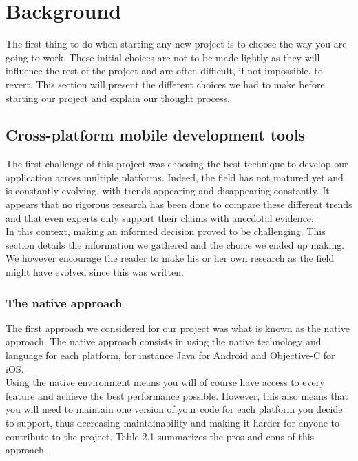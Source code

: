 \documentclass{eplmastersthesis}
\begin{document}
\chapter{Background}

The first thing to do when starting any new project is to choose the way you are going to work. These initial choices are not to be made lightly as they will influence the rest of the project and are often difficult, if not impossible, to revert. This section will present the different choices we had to make before starting our project and explain our thought process. 

\section{Cross-platform mobile development tools}

The first challenge of this project was choosing the best technique to develop our application across multiple platforms. Indeed, the field has not matured yet and is constantly evolving, with trends appearing and disappearing constantly. It appears that no rigorous research has been done to compare these different trends and that even experts only support their claims with anecdotal evidence.\\

 In this context, making an informed decision proved to be challenging. This section details the information we gathered and the choice we ended up making. We however encourage the reader to make his or her own research as the field might have evolved since this was written.

\subsection{The native approach}

The first approach we considered for our project was what is known as the native approach. The native approach consists in using the native technology and language for each platform, for instance Java for Android and Objective-C for iOS. \\

Using the native environment means you will of course have access to every feature and achieve the best performance possible. However, this also means that you will need to maintain one version of your code for each platform you decide to support, thus decreasing maintainability and making it harder for anyone to contribute to the project. Table 2.1 summarizes the pros and cons of this approach.
\end{document}
